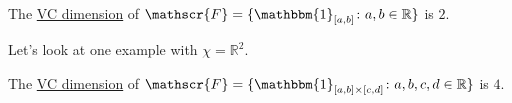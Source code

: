 \begin{eg}
	The \hyperref[def:VC-dimension]{VC dimension} of \(\mathscr{F} = \{ \mathbbm{1}_{[a, b]} \colon a, b \in \mathbb{R}  \} \) is \(2\).
\end{eg}

Let's look at one example with \(\chi = \mathbb{R} ^2\).
\begin{eg}
	The \hyperref[def:VC-dimension]{VC dimension} of \(\mathscr{F} = \{ \mathbbm{1}_{[a, b]\times [c, d]} \colon a, b , c, d\in \mathbb{R} \} \) is \(4\).
\end{eg}